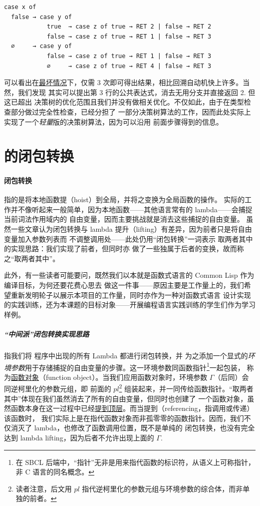 \begin{verbatim}
case x of
  false → case y of
            true  → case z of true → RET 2 | false → RET 2
            false → case z of true → RET 1 | false → RET 3
  ∅     → case y of
            false → case z of true → RET 1 | false → RET 3
            ∅     → case z of true → RET 4 | false → RET 3
\end{verbatim}

可以看出在\underline{最坏情况}下，仅需 3 次即可得出结果，相比回溯自动机快上许多。当然，我们发现
其实可以提出第 3 行的公共表达式，消去无用分支并直接返回 2. 但这已超出
决策树的优化范围且我们并没有做相关优化。不仅如此，由于在类型检查部分做过完全性检查，已经分担了
一部分决策树算法的工作，因而此处实际上实现了一个\emph{轻量}版的决策树算法，因为可以沿用
前面步骤得到的信息。

\section{\Lambdair 的闭包转换}

\paragraph{闭包转换} 指的是将本地函数提（hoist）到全局，并将之变换为全局函数的操作。
实际的工作并不像听起来一般简单，因为本地函数——其他语言常有的 lambda——会捕捉当前词法作用域内的
自由变量，因而主要挑战就是消去这些捕捉的自由变量。
虽然一些文章认为闭包转换与 lambda 提升（lifting）有差异，因为前者只是将自由变量加入参数列表而
不调整调用处——此处仍用“闭包转换”一词表示 \Tigris 取两者其中的实现思路：我们实现了前者，但同时亦
做了一些独属于后者的变换，故而称之“取两者其中”。

此外，有一些读者可能要问，既然我们以本就是函数式语言的 Common Lisp 作为编译目标，为何还要花费心思去
做这一件事——原因主要是工作量上的，我们希望重新发明轮子以展示本项目的工作量，同时亦作为一种对函数式语言
设计实现的实践训练，还为本课题的目标对象——开展编程语言实践训练的学生们作为学习样例。

\subparagraph{“中间派”闭包转换实现思路} 指我们将 \Tigris 程序中出现的所有 Lambda 都进行闭包转换，并
为之添加一个显式的\emph{环境参数}用于存储捕捉的自由变量的步骤。这一环境参数同函数指针\footnote{
  在 SBCL 后端中，“指针”无非是用来指代函数的标识符，从语义上可称指针，非 C 语言的同名概念。
}一起包装，
称为\underline{函数对象}（function object）。当我们应用函数对象时，环境参数 $\Gamma$（后同）会同逆柯里化的参数元组，即
前面的 $pl$\footnote{
  读者注意，后文用 $pl$ 指代逆柯里化的参数元组与环境参数的综合体，而非单独的前者。
}
组装起来，并一同传给函数指针。“取两者其中”体现在我们虽然消去了所有的自由变量，但同时也创建了
一个函数对象，虽然函数本身在这一过程中已经\underline{提到顶层}。而当提到（referencing，指调用或传递）该函数时，
我们实际上是在指代函数对象而非孤零零的函数指针。因而，我们不仅消灭了 lambda，也修改了函数调用位置，既不是单纯的
闭包转换，也没有完全达到 lambda lifting，因为后者不允许出现上面的 $\Gamma$.

